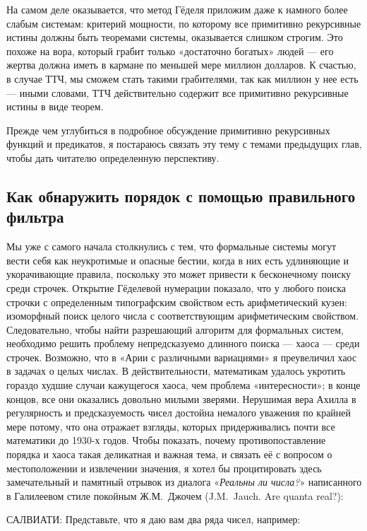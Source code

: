 \documentclass[../main.tex]{subfiles}
\begin{document}
На самом деле оказывается, что метод Гёделя приложим даже к намного более слабым системам: критерий мощности, по которому все примитивно рекурсивные истины должны быть теоремами системы, оказывается слишком строгим. Это похоже на вора, который грабит только «достаточно богатых» людей --- его жертва должна иметь в кармане по меньшей мере миллион долларов. К счастью, в случае ТТЧ, мы сможем стать такими грабителями, так как миллион у нее есть --- иными словами, ТТЧ действительно содержит все примитивно рекурсивные истины в виде теорем.

Прежде чем углубиться в подробное обсуждение примитивно рекурсивных функций и предикатов, я постараюсь связать эту тему с темами предыдущих глав, чтобы дать читателю определенную перспективу.


\subsection{Как обнаружить порядок с помощью правильного фильтра}

Мы уже с самого начала столкнулись с тем, что формальные системы могут вести себя как неукротимые и опасные бестии, когда в них есть удлиняющие и укорачивающие правила, поскольку это может привести к бесконечному поиску среди строчек. Открытие Гёделевой нумерации показало, что у любого поиска строчки с определенным типографским свойством есть арифметический кузен: изоморфный поиск целого числа с соответствующим арифметическим свойством. Следовательно, чтобы найти разрешающий алгоритм для формальных систем, необходимо решить проблему непредсказуемо длинного поиска --- хаоса --- среди строчек. Возможно, что в «Арии с различными вариациями» я преувеличил хаос в задачах о целых числах. В действительности, математикам удалось укротить гораздо худшие случаи кажущегося хаоса, чем проблема «интересности»; в конце концов, все они оказались довольно милыми зверями. Нерушимая вера Ахилла в регулярность и предсказуемость чисел достойна немалого уважения по крайней мере потому, что она отражает взгляды, которых придерживались почти все математики до 1930-х годов. Чтобы показать, почему противопоставление порядка и хаоса такая деликатная и важная тема, и связать её с вопросом о местоположении и извлечении значения, я хотел бы процитировать здесь замечательный и памятный отрывок из диалога «\emph{Реальны ли числа?}» написанного в Галилеевом стиле покойным Ж.М.~Джочем (J.M.~Jauch. Are quanta real?):

САЛВИАТИ: Представьте, что я даю вам два ряда чисел, например:
\end{document}
